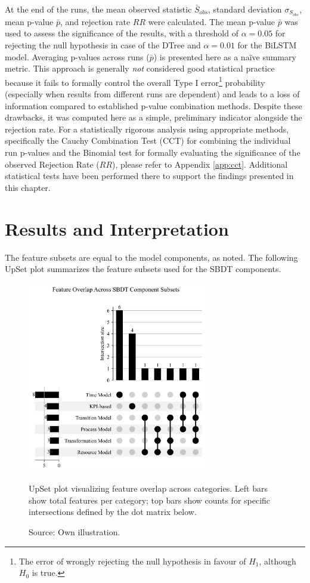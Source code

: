 At the end of the runs, the mean observed statistic $\bar{S}_{obs}$, standard deviation $\sigma_{S_{obs}}$, mean p-value $\bar{p}$, and rejection rate $RR$ were calculated. The mean p-value $\bar{p}$ was used to assess the significance of the results, with a threshold of $\alpha = 0.05$ for rejecting the null hypothesis in case of the DTree and $\alpha = 0.01$ for the BiLSTM model. Averaging p-values across runs ($\bar{p}$) is presented here as a naïve summary metric. This approach is generally \textit{not} considered good statistical practice because it fails to formally control the overall Type I error\footnote{The error of wrongly rejecting the null hypothesis in favour of $H_1$, although $H_0$ is true.} probability (especially when results from different runs are dependent) and leads to a loss of information compared to established p-value combination methods. Despite these drawbacks, it was computed here as a simple, preliminary indicator alongside the rejection rate. For a statistically rigorous analysis using appropriate methods, specifically the Cauchy Combination Test (CCT) for combining the individual run p-values and the Binomial test for formally evaluating the significance of the observed Rejection Rate ($RR$), please refer to Appendix \ref{app:cct}. Additional statistical tests have been performed there to support the findings presented in this chapter.

\section{Results and Interpretation}
The feature subsets are equal to the model components, as noted. The following UpSet plot summarizes the feature subsets used for the SBDT components.

\begin{figure}[htbp]
  \centering
  \includegraphics[width=0.7\textwidth]{figures/upset.png}
  \caption[UpSet plot]{UpSet plot visualizing feature overlap across categories. Left bars show total features per category; top bars show counts for specific intersections defined by the dot matrix below.}
  \caption*{Source: Own illustration.}
  \label{fig:upsetplot}
\end{figure}

